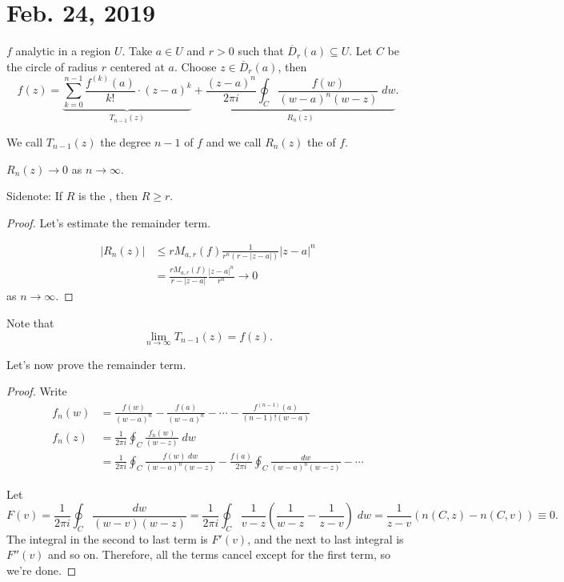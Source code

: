 \documentclass[notes]{subfile}
\begin{document}
\section{Feb. 24, 2019}

$f$ analytic in a region $U$.
Take $a \in U$ and $r > 0$ such that $\overline{D}_r(a) \subseteq U$.  Let $C$ be the circle of radius $r$ centered at $a$.
Choose $z \in \overline{D}_r(a)$, then
\[ f(z) = \underbrace{\sum_{k=0}^{n-1} 
        \frac{f^{(k)}(a)}{k!}
\cdot (z-a)^k }_{T_{n-1}(z)} + \underbrace{\frac{(z-a)^n}{2\pi i} \oint_C \frac{f(w)}{(w-a)^n(w-z)} \; dw}_{R_n(z)}. \]

We call $T_{n-1}(z)$ the degree $n-1$ 
of $f$ and we call $R_n(z)$ the 
of $f$.

\begin{lemma}
    $R_n (z) \to 0 $ as $n \to \infty$.
    \label{}
\end{lemma}

Sidenote: If $R$ is the , then $R \ge r$.

\begin{proof}
    
    Let's estimate the remainder term.

    \begin{align*}
        |R_n(z)| &\le r M_{a, r}(f) \frac{1}{r^n(r - |z-a|)} |z-a|^n 
        \tag{ML Theorem} \\
        &= \frac{rM_{a, r}(f)}{r - |z-a|} \frac{|z-a|^n}{r^n} \to 0
    \end{align*}
    as $n \to \infty$.
\end{proof}


Note that
\[ \lim_{n \to \infty} T_{n-1}(z)  = f(z). \]

Let's now prove the remainder term.

\begin{proof}
    Write
    \begin{align*}
        f_n(w) &= \frac{f(w)}{(w-a)^n} - \frac{f(a)}{(w-a)^n}
        - \cdots - \frac{f^{(n-1)}(a)}{(n-1)!(w-a)} \\
        f_n(z) &= \frac{1}{2\pi i} \oint_C \frac{f_n(w)}{(w-z)} \; dw \\
        &= \frac{1}{2\pi i} \oint_C \frac{f(w) \;dw}{(w-a)^n(w-z)} - 
        \frac{f(a)}{2\pi i}\oint_C \frac{dw}{(w-a)^n(w-z)}
        - \cdots
    \end{align*}

    Let 
    \[ F(v) = \frac{1}{2\pi i} \oint_C \frac{dw}{(w-v)(w-z)}
    = \frac{1}{2\pi i} \oint_C \frac{1}{v-z} \left( \frac{1}{w-z} - \frac{1}{z-v}\right) \; dw
    = \frac{1}{z-v} \left( n(C, z) - n(C, v)\right) \equiv 0.
    \]
    The integral in the second to last term is $F'(v)$, and 
    the next to last integral is $F''(v)$ and so on.
    Therefore, all the terms cancel except for the first term,
    so we're done.
\end{proof}
\end{document}
